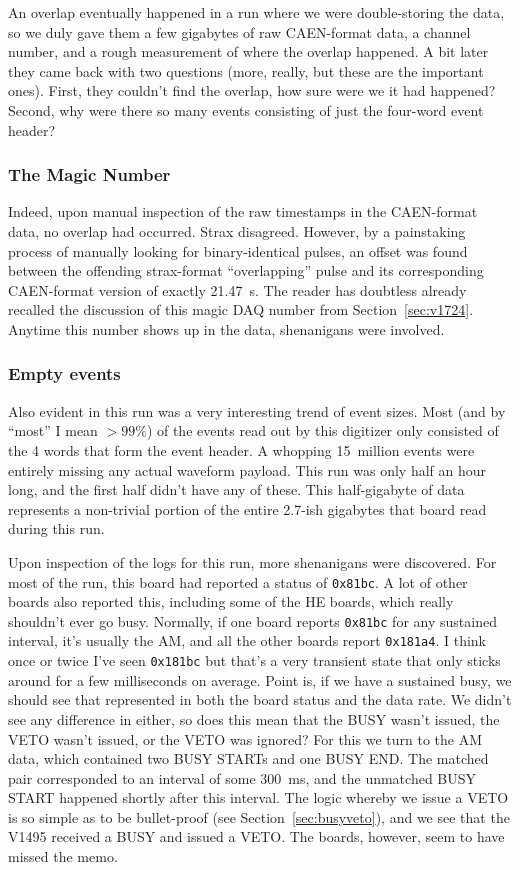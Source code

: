 An overlap eventually happened in a run where we were double-storing the data, so we duly gave them a few gigabytes of raw CAEN-format data, a channel number, and a rough measurement of where the overlap happened.
A bit later they came back with two questions (more, really, but these are the important ones).
First, they couldn't find the overlap, how sure were we it had happened?
Second, why were there so many events consisting of just the four-word event header?

\subsubsection{The Magic Number}

Indeed, upon manual inspection of the raw timestamps in the CAEN-format data, no overlap had occurred.
Strax disagreed.
However, by a painstaking process of manually looking for binary-identical pulses, an offset was found between the offending strax-format ``overlapping'' pulse and its corresponding CAEN-format version of exactly \SI{21.47}{\second}.
The reader has doubtless already recalled the discussion of this magic DAQ number from Section~\ref{sec:v1724}.
Anytime this number shows up in the data, shenanigans were involved.

\subsubsection{Empty events}

Also evident in this run was a very interesting trend of event sizes.
Most (and by ``most'' I mean $>99\%$) of the events read out by this digitizer only consisted of the 4 words that form the event header.
A whopping 15~million events were entirely missing any actual waveform payload.
This run was only half an hour long, and the first half didn't have any of these.
This half-gigabyte of data represents a non-trivial portion of the entire 2.7-ish gigabytes that board read during this run.

Upon inspection of the logs for this run, more shenanigans were discovered.
For most of the run, this board had reported a status of \texttt{0x81bc}.
A lot of other boards also reported this, including some of the HE boards, which really shouldn't ever go busy.
Normally, if one board reports \texttt{0x81bc} for any sustained interval, it's usually the AM, and all the other boards report \texttt{0x181a4}.
I think once or twice I've seen \texttt{0x181bc} but that's a very transient state that only sticks around for a few milliseconds on average.
Point is, if we have a sustained busy, we should see that represented in both the board status and the data rate.
We didn't see any difference in either, so does this mean that the BUSY wasn't issued, the VETO wasn't issued, or the VETO was ignored?
For this we turn to the AM data, which contained two BUSY STARTs and one BUSY END.
The matched pair corresponded to an interval of some \SI{300}{\milli\second}, and the unmatched BUSY START happened shortly after this interval.
The logic whereby we issue a VETO is so simple as to be bullet-proof (see Section~\ref{sec:busyveto}), and we see that the V1495 received a BUSY and issued a VETO.
The boards, however, seem to have missed the memo.

